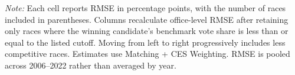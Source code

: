 \begin{table}[!htbp]
{\begin{threeparttable}
\begin{tabular}{lccccc}
\bottomrule
\end{tabular}
\begin{tablenotes}
\footnotesize
\item \textit{Note:} Each cell reports RMSE in percentage points, with the number of races included in parentheses. Columns recalculate office-level RMSE after retaining only races where the winning candidate's benchmark vote share is less than or equal to the listed cutoff. Moving from left to right progressively includes less competitive races. Estimates use Matching + CES Weighting. RMSE is pooled across 2006--2022 rather than averaged by year.
\end{tablenotes}
\end{threeparttable}%
}
\end{table}
